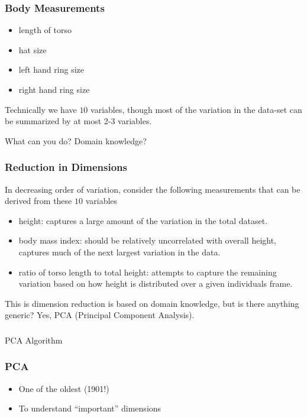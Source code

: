 \begin{frame}[fragile] \frametitle{Body Measurements}
\begin{itemize}
\item length of torso
\item hat size
\item left hand ring size
\item right hand ring size
\end{itemize}
Technically we have $10$ variables, though most of the variation
in the data-set can be summarized by at most 2-3 variables.

What can you do? Domain knowledge?
\end{frame}

\begin{frame}[fragile] \frametitle{Reduction in Dimensions} 
In decreasing order of variation, consider the following measurements
that can be derived from these $10$ variables
\begin{itemize}
\item height: captures a large amount of the variation in the total
dataset. 
\item body mass index: should be
relatively uncorrelated with overall height, captures much of the
next largest variation in the data. 
\item ratio of torso length to total height: attempts
to capture the remaining variation based on how height is distributed
over a given individuals frame.
\end{itemize}

This is dimension reduction is based on domain knowledge, but is there anything generic? Yes, PCA (Principal Component Analysis).

\end{frame}

\begin{frame}[fragile]\frametitle{}
\begin{center}
{\Large PCA Algorithm}
\end{center}
\end{frame}

\begin{frame}[fragile] \frametitle{PCA} 
\begin{itemize}
\item One of the oldest (1901!) 
\item To understand ``important'' dimensions
\end{itemize}
\end{frame}

